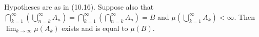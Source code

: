 Hypotheses are as in (10.16). Suppose also that $\bigcap_{k=1}^{\infty} \left( \bigcup_{n=k}^{\infty} A_n \right) = \bigcap_{k=1}^{\infty} \left( \bigcap_{n=k}^{\infty} A_n \right) = B$ and $\mu \left( \bigcup_{k=1}^{\infty} A_k \right) < \infty$. Then $\lim_{k \to \infty} \mu(A_k)$ exists and is equal to $\mu(B)$.